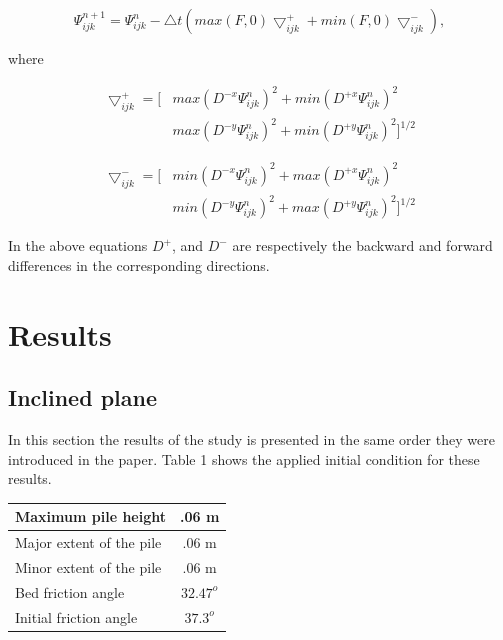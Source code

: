 \documentclass[letterpaper,10pt]{article}
\begin{document}
\begin{equation}
 \varPsi_{ijk}^{n+1}=\varPsi_{ijk}^{n}-\bigtriangleup t \left(max(F,0)\bigtriangledown_{ijk}^{+}+min(F,0)\bigtriangledown_{ijk}^{-} \right),
\end{equation}

where 

\begin{equation}
\begin{aligned}
 \bigtriangledown_{ijk}^{+} = \big[ & max(D^{-x}\varPsi_{ijk}^{n})^2 + min(D^{+x}\varPsi_{ijk}^{n})^2
 \\& max(D^{-y}\varPsi_{ijk}^{n})^2 + min(D^{+y}\varPsi_{ijk}^{n})^2 \big]^{1/2}
\end{aligned}
\end{equation}
 
\begin{equation}
\begin{aligned}
 \bigtriangledown_{ijk}^{-} = \big[ & min(D^{-x}\varPsi_{ijk}^{n})^2 + max(D^{+x}\varPsi_{ijk}^{n})^2
 \\& min(D^{-y}\varPsi_{ijk}^{n})^2 + max(D^{+y}\varPsi_{ijk}^{n})^2 \big]^{1/2}
\end{aligned}
\end{equation} 

In the above equations $D^+$, and $D^-$ are  respectively the backward and forward differences in the corresponding directions.


\section{Results} \label{results}
\subsection{Inclined plane}
In this section the results of the study is presented in the same order they were introduced in the paper.
Table 1 shows the applied initial condition for these results.
\begin{center}
 
\begin{tabular}{|l|c|}

\hline
Maximum pile height       & .06 m \\
\hline
Major extent of the pile  & .06 m \\
\hline
Minor extent of the pile  & .06 m \\
\hline           
Bed friction angle        & $32.47^o$ \\
\hline
Initial friction angle    & $37.3^o$ \\
\hline
\end{tabular}
\end{center}
\end{document}
